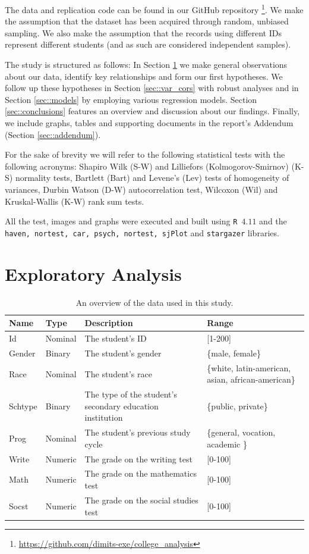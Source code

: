 \documentclass[10pt, a4paper]{article}
\def\code#1{\texttt{#1}}
\begin{document}
	The data and replication code can be found in our GitHub repository \footnote{\url{https://github.com/dimits-exe/college_analysis}}. We make the assumption that the dataset has been acquired through random, unbiased sampling. We also make the assumption that the records using different IDs represent different students (and as such are considered independent samples).
	
	The study is structured as follows: In Section \ref{sec::exploratory} we make general observations about our data, identify key relationships and form our first hypotheses. We follow up these hypotheses in Section \ref{sec::var_cors} with robust analyses and in Section \ref{sec::models} by employing various regression models. Section \ref{sec::conclusions} features an overview and discussion about our findings. Finally, we include graphs, tables and supporting documents in the report's Addendum (Section \ref{sec::addendum}).
	
	For the sake of brevity we will refer to the following statistical tests with the following acronyms: Shapiro Wilk (S-W) and Lilliefors (Kolmogorov-Smirnov) (K-S) normality tests, Bartlett (Bart) and Levene's (Lev) tests of homogeneity of variances, Durbin Watson (D-W) autocorrelation test, Wilcoxon (Wil) and Kruskal-Wallis (K-W) rank sum tests.
	
	All the test, images and graphs were executed and built using \code{R $4.11$} and the \code{haven, nortest, car, psych, nortest, sjPlot} and \code{stargazer} libraries.
	
	\section{Exploratory Analysis}
	\label{sec::exploratory}
	
	\begin{table}
		\centering
		\begin{tabular}
			{ |p{1cm} p{1cm} p{5cm} p{3cm}| }
			\hline
			\textbf{Name} & \textbf{Type} & \textbf{Description} & \textbf{Range}\\
			\hline
			Id  & Nominal & The student's ID & [1-200] \\
			Gender  & Binary & The student's gender & \{male, female\} \\
			Race  & Nominal & The student's race & \{white, latin-american, asian, african-american\} \\
			Schtype  & Binary & The type of the student's secondary education institution & \{public, private\} \\
			Prog  & Nominal & The student's previous study cycle  & \{general, vocation, academic \} \\
			Write  & Numeric & The grade on the writing test  & [0-100] \\
			Math  & Numeric & The grade on the mathematics test  & [0-100] \\
			Socst  & Numeric & The grade on the social studies test & [0-100] \\
			\hline
		\end{tabular}
		\caption{An overview of the data used in this study.}
		\label{tab::dataset}
	\end{table}
	
\end{document}
